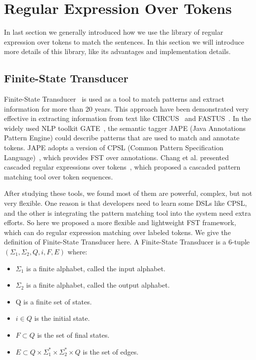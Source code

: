 \section{Regular Expression Over Tokens}

In last section we generally introduced how we use the library of regular expression over tokens to match the sentences. In this section we will introduce more details of this library, like its advantages and implementation details.

\subsection{Finite-State Transducer}
Finite-State Transducer~\cite{roche1997finite} is used as a tool to match patterns and extract information for more than 20 years. This approach have been demonstrated very effective in extracting information from text like CIRCUS~\cite{lehnert1991university} and FASTUS~\cite{hobbs199713}.  In the widely used NLP toolkit GATE~\cite{cunningham2002framework}, the semantic tagger JAPE (Java Annotations Pattern Engine) could describe patterns that are used to match and annotate tokens. JAPE adopts a version of CPSL (Common Pattern  Specification Language)~\cite{appelt1998common}, which provides FST over annotations. Chang et al. presented cascaded regular expressions over tokens~\cite{chang2014tokensregex}, which proposed a cascaded pattern matching tool over token sequences.

After studying these tools, we found most of them are powerful, complex, but not very flexible. One reason is that developers need to learn some DSLs like CPSL, and the other is  integrating the pattern matching tool into the system need extra efforts. So here we proposed a more flexible and lightweight FST framework, which can do regular expression matching over labeled tokens. We give the definition of Finite-State Transducer here. A Finite-State Transducer is a 6-tuple $(\Sigma_1, \Sigma_2, Q, i, F, E)$ where:
\begin{itemize}
  \item $\Sigma_1$ is a finite alphabet, called the input alphabet.
  \item $\Sigma_2$ is a finite alphabet, called the output alphabet.
  \item Q is a finite set of states.
  \item $i \in Q$ is the initial state.
  \item $F \subset Q$ is the set of final states.
  \item $E \subset  Q  \times \Sigma_1^* \times \Sigma_2^* \times Q$ is the set of edges.
\end{itemize}


